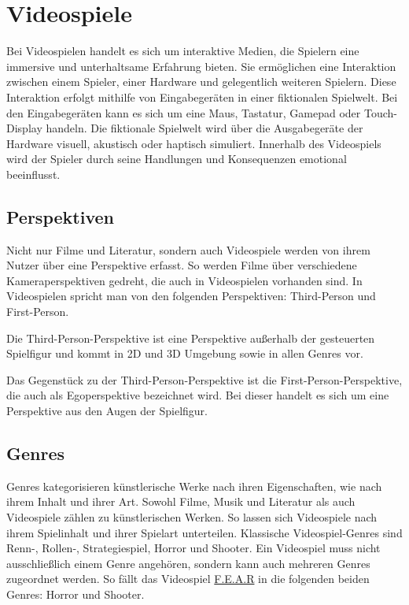\chapter{Videospiele}
\label{chap:videospiele}

Bei Videospielen handelt es sich um interaktive Medien, die Spielern eine immersive und unterhaltsame Erfahrung bieten. Sie erm\"{o}glichen eine Interaktion zwischen einem Spieler, einer Hardware und gelegentlich weiteren Spielern. Diese Interaktion erfolgt mithilfe von Eingabeger\"{a}ten in einer fiktionalen Spielwelt. Bei den Eingabeger\"{a}ten kann es sich um eine Maus, Tastatur, Gamepad oder Touch-Display handeln. Die fiktionale Spielwelt wird \"{u}ber die Ausgabeger\"{a}te der Hardware visuell, akustisch oder haptisch simuliert. Innerhalb des Videospiels wird der Spieler durch seine Handlungen und Konsequenzen emotional beeinflusst. \autocite{Bergonse}

\section{Perspektiven}
\label{chap:perspektiven}

Nicht nur Filme und Literatur, sondern auch Videospiele werden von ihrem Nutzer \"{u}ber eine Perspektive erfasst. So werden Filme \"{u}ber verschiedene Kameraperspektiven gedreht, die auch in Videospielen vorhanden sind. In Videospielen spricht man von den folgenden Perspektiven: Third-Person und First-Person.

Die Third-Person-Perspektive ist eine Perspektive au\ss{}erhalb der gesteuerten Spielfigur und kommt in 2D und 3D Umgebung sowie in allen Genres vor.

Das Gegenst\"{u}ck zu der Third-Person-Perspektive ist die First-Person-Perspektive, die auch als Egoperspektive bezeichnet wird. Bei dieser handelt es sich um eine Perspektive aus den Augen der Spielfigur.

\section{Genres}
\label{chap:genres}

Genres kategorisieren k\"{u}nstlerische Werke nach ihren Eigenschaften, wie nach ihrem Inhalt und ihrer Art. Sowohl Filme, Musik und Literatur als auch Videospiele z\"{a}hlen zu k\"{u}nstlerischen Werken. So lassen sich Videospiele nach ihrem Spielinhalt und ihrer Spielart unterteilen. Klassische Videospiel-Genres sind Renn-, Rollen-, Strategiespiel, Horror und Shooter. Ein Videospiel muss nicht ausschlie\ss{}lich einem Genre angeh\"{o}ren, sondern kann auch mehreren Genres zugeordnet werden. So f\"{a}llt das Videospiel \hyperref[fig:fps tps]{F.E.A.R} in die folgenden beiden Genres: Horror und Shooter.


